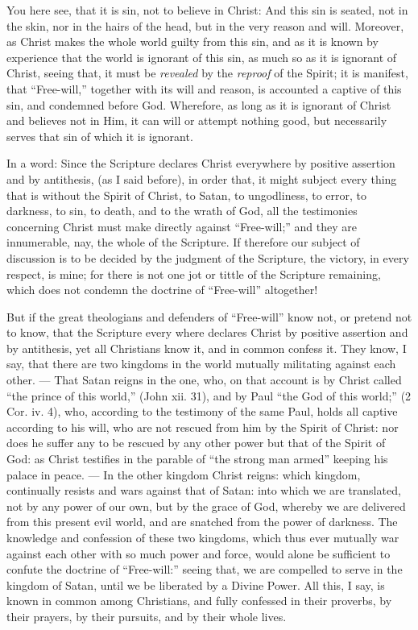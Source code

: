You here see, that it is sin, not to believe in Christ: And this sin is seated, not in the skin, nor in the hairs of the head, but in the very reason and will. Moreover, as Christ makes the whole world guilty from this sin, and as it is known by experience that the world is ignorant of this sin, as much so as it is ignorant of Christ, seeing that, it must be \emph{revealed }by the \emph{reproof }of the Spirit; it is manifest, that “Free-will,” together with its will and reason, is accounted a captive of this sin, and condemned before God. Wherefore, as long as it is ignorant of Christ and believes not in Him, it can will or attempt nothing good, but necessarily serves that sin of which it is ignorant.

In a word: Since the Scripture declares Christ everywhere by positive assertion and by antithesis, (as I said before), in order that, it might subject every thing that is without the Spirit of Christ, to Satan, to ungodliness, to error, to darkness, to sin, to death, and to the wrath of God, all the testimonies concerning Christ must make directly against “Free-will;” and they are innumerable, nay, the whole of the Scripture. If therefore our subject of discussion is to be decided by the judgment of the Scripture, the victory, in every respect, is mine; for there is not one jot or tittle of the Scripture remaining, which does not condemn the doctrine of “Free-will” altogether!

But if the great theologians and defenders of “Free-will” know not, or pretend not to know, that the Scripture every where declares Christ by positive assertion and by antithesis, yet all Christians know it, and in common confess it. They know, I say, that there are two kingdoms in the world mutually militating against each other. — That Satan reigns in the one, who, on that account is by Christ called “the prince of this world,” (John xii. 31), and by Paul “the God of this world;” (2 Cor. iv. 4), who, according to the testimony of the same Paul, holds all captive according to his will, who are not rescued from him by the Spirit of Christ: nor does he suffer any to be rescued by any other power but that of the Spirit of God: as Christ testifies in the parable of “the strong man armed” keeping his palace in peace. — In the other kingdom Christ reigns: which kingdom, continually resists and wars against that of Satan: into which we are translated, not by any power of our own, but by the grace of God, whereby we are delivered from this present evil world, and are snatched from the power of darkness. The knowledge and confession of these two kingdoms, which thus ever mutually war against each other with so much power and force, would alone be sufficient to confute the doctrine of “Free-will:” seeing that, we are compelled to serve in the kingdom of Satan, until we be liberated by a Divine Power. All this, I say, is known in common among Christians, and fully confessed in their proverbs, by their prayers, by their pursuits, and by their whole lives.

